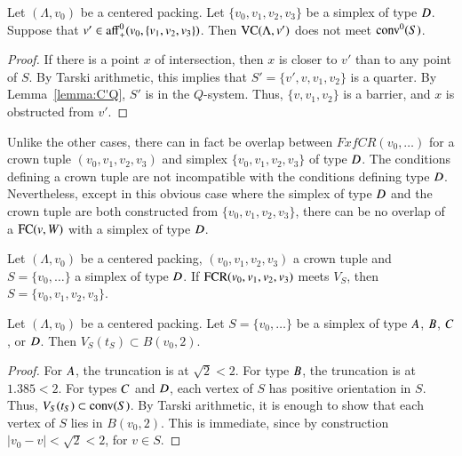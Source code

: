 \begin{lemma}
Let $(\Lambda,v_0)$ be a centered packing.  Let $\{v_0,v_1,v_2,v_3\}$ be a simplex
of type $D$. 
Suppose that $v'\in{\operatorname{aff}}_+^0(v_0,\{v_1,v_2,v_3\})$.  Then ${\operatorname{VC}}(\Lambda,v')$ does
not meet ${\operatorname{conv}}^0(S)$.
\end{lemma}

\begin{proof} If there is a point $x$ of intersection, then
$x$ is closer to $v'$ than to any point of $S$. 
By Tarski arithmetic, this implies that 
$S'=\{v',v,v_1,v_2\}$ is a quarter.  By Lemma~\ref{lemma:C'Q},
$S'$ is in the $Q$-system.  Thus, $\{v,v_1,v_2\}$ is a barrier,
and $x$ is obstructed from $v'$.
\end{proof}


Unlike the other cases, there can in fact be overlap between 
$FxfCR(v_0,\ldots)$ for a crown tuple $(v_0,v_1,v_2,v_3)$ and simplex $\{v_0,v_1,v_2,v_3\}$ 
of type $D$.  The
conditions defining a crown tuple are not incompatible with
the conditions defining type $D$.  Nevertheless, except in this
obvious case where the simplex of type $D$ and the crown tuple are both
constructed from $\{v_0,v_1,v_2,v_3\}$, there
can be no overlap of a ${\operatorname{FC}}(v,W)$ with a simplex of type
$D$.

\begin{lemma}
Let $(\Lambda,v_0)$ be a centered packing, $(v_0,v_1,v_2,v_3)$ a crown tuple and $S=\{v_0,\ldots\}$ a
simplex of type $D$.  If ${\operatorname{FCR}}(v_0,v_1,v_2,v_3)$ meets $V_S$, then
$S = \{v_0,v_1,v_2,v_3\}$.
\end{lemma}



\begin{lemma}
Let $(\Lambda,v_0)$ be a centered packing.  Let $S=\{v_0,\ldots\}$ be a simplex of type
$A$, $B$, $C$, or $D$.  Then $V_S(t_S)\subset B(v_0,2)$.
\end{lemma}

\begin{proof}  For $A$, the truncation is at $\sqrt2 < 2$.  For type $B$, the truncation
is at $1.385 < 2$.  For types $C$ and $D$, each vertex of $S$ has positive orientation in
$S$.  Thus,  $V_S(t_S) \subset {\operatorname{conv}}(S)$.  By Tarski arithmetic, 
it is enough to show that each vertex
of $S$ lies in $B(v_0,2)$.  This is immediate, since by construction $|v_0-v|<\sqrt2 < 2$, for $v\in S$.
\end{proof}

